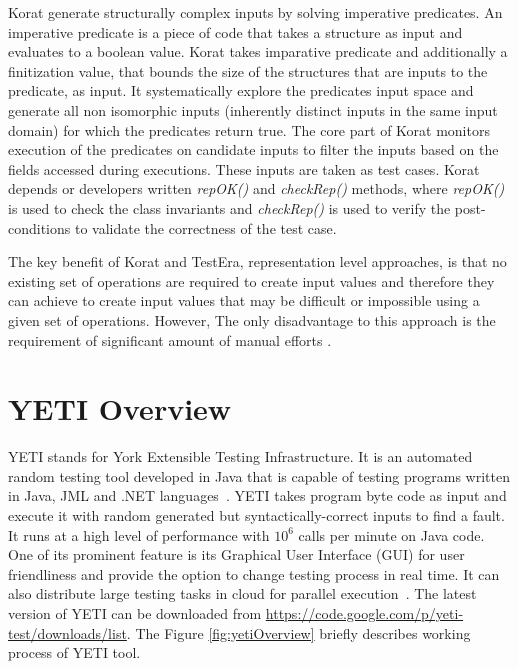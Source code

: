 Korat generate structurally complex inputs by solving imperative predicates. An imperative predicate is a piece of code that takes a structure as input and evaluates to a boolean value. Korat takes imparative predicate and additionally a finitization value, that bounds the size of the structures that are inputs to the predicate, as input. It systematically explore the predicates input space and generate all non isomorphic inputs (inherently distinct inputs in the same input domain) for which the predicates return true. The core part of Korat monitors execution of the predicates on candidate inputs to filter the inputs based on the fields accessed during executions. These inputs are taken as test cases. Korat depends or developers written {\it repOK()} and {\it checkRep()} methods, where {\it repOK()} is used to check the class invariants and {\it checkRep()} is used to verify the post-conditions to validate the correctness of the test case. 

The key benefit of Korat and TestEra, representation level approaches, is that no existing set of operations are required to create input values and therefore they can achieve to create input values that may be difficult or impossible using a given set of operations. However, The only disadvantage to this approach is the requirement of significant amount of manual efforts \cite{pacheco2009directed}.    


\newpage

\section{YETI Overview}
YETI stands for York Extensible Testing Infrastructure. It is an automated random testing tool developed in Java that is capable of testing programs written in Java, JML and .NET languages~\cite{Oriol2010c}. YETI takes program byte code as input and execute it with random generated but syntactically-correct inputs to find a fault. It runs at a high level of performance with $10^6$ calls per minute on Java code. One of its prominent feature is its Graphical User Interface (GUI) for user friendliness and provide the option to change testing process in real time. It can also distribute large testing tasks in cloud for parallel execution~\cite{Oriol2010}. The latest version of YETI can be downloaded from \url{https://code.google.com/p/yeti-test/downloads/list}. The Figure \ref{fig:yetiOverview} briefly describes working process of YETI tool. 

